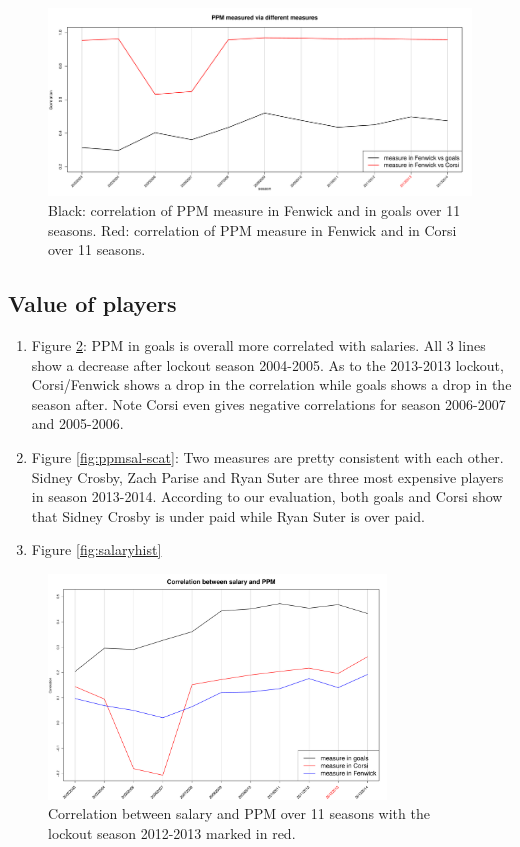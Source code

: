 \begin{figure}[htb!]
	\centering
	\includegraphics[width=\textwidth]{figures/ppm-corr-diffmeasure-season.pdf}
	\caption{Black: correlation of PPM measure in Fenwick and in goals over 11 seasons.  Red: correlation of PPM measure in Fenwick and in Corsi over 11 seasons.}\label{fig:ppm-corr-diffmeasure-season}
\end{figure}

\subsection{Value of players}
\label{sec:salary}

\begin{enumerate}
	\item Figure \ref{fig:ppmsal-corr-season}: PPM in goals is overall more correlated with salaries. All 3 lines show a decrease after lockout season 2004-2005. As to the 2013-2013 lockout, Corsi/Fenwick shows a drop in the correlation while goals shows a drop in the season after. Note Corsi even gives negative correlations for season 2006-2007 and 2005-2006. 
	\item Figure \ref{fig:ppmsal-scat}: Two measures are pretty consistent with each other. Sidney Crosby, Zach Parise and Ryan Suter are three most expensive players in season 2013-2014. According to our evaluation, both goals and Corsi show that Sidney Crosby is under paid while Ryan Suter is over paid. 
	\item Figure \ref{fig:salaryhist}
\end{enumerate}

\begin{figure}[htb!]
	\centering
	\includegraphics[width=0.8\textwidth]{figures/ppmsal-corr-season.pdf}
	\caption{Correlation between salary and PPM over 11 seasons with the lockout season 2012-2013 marked in red.}\label{fig:ppmsal-corr-season}
\end{figure}

